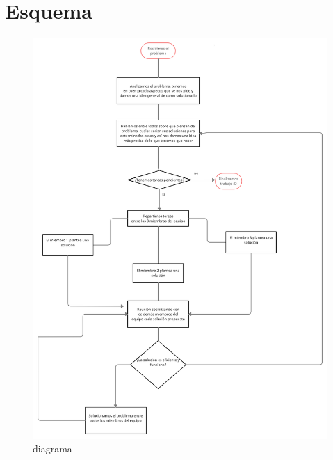\documentclass{article}
\begin{document}
\label{fig:my_label}
\section{Esquema} \label{contenido}
\begin{figure}
    \centering
    \includegraphics[width=16cm]{diagrama.png}
    \caption{diagrama}
    \label{fig:my_label}
\end{figure}


\end{document}
